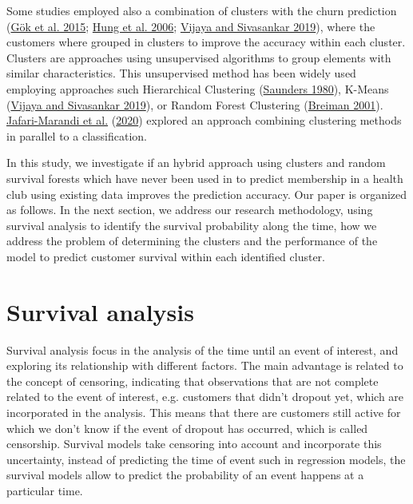 \documentclass[
  12pt,
]{article}
\begin{document}
Some studies employed also a combination of clusters with the churn prediction
(\protect\hyperlink{ref-gok_case_2015}{Gök et al. 2015}; \protect\hyperlink{ref-hung_applying_2006}{Hung et al. 2006}; \protect\hyperlink{ref-vijaya_sivasankar_2019}{Vijaya and Sivasankar 2019}), where the customers
where grouped in clusters to improve the accuracy within each cluster.
Clusters are approaches using unsupervised algorithms to group elements
with similar characteristics.
This unsupervised method has been widely used employing approaches
such Hierarchical Clustering (\protect\hyperlink{ref-Saunders_1980}{Saunders 1980}), K-Means (\protect\hyperlink{ref-vijaya_sivasankar_2019}{Vijaya and Sivasankar 2019}), or
Random Forest Clustering (\protect\hyperlink{ref-Breiman_2001}{Breiman 2001}).
\protect\hyperlink{ref-JafariMarandi_Denton_Idris_Smith_Keramati_2020}{Jafari-Marandi et al.} (\protect\hyperlink{ref-JafariMarandi_Denton_Idris_Smith_Keramati_2020}{2020}) explored an approach combining
clustering methods in parallel to a classification.

In this study, we investigate if an hybrid approach using clusters and random survival forests
which have never been used in to predict membership in a health club using existing data
improves the prediction accuracy.
Our paper is organized as follows. In the next section, we address our research methodology,
using survival analysis to identify the survival probability along the time, how
we address the problem of determining the clusters and the performance of the model
to predict customer survival within each identified cluster.

\hypertarget{survival-analysis}{%
\section{Survival analysis}\label{survival-analysis}}

Survival analysis focus in the analysis of the time until an event of interest,
and exploring its relationship with different factors.
The main advantage is related to the concept of censoring, indicating
that observations that are not complete related to the event of interest, e.g.
customers that didn't dropout yet, which are incorporated in the analysis.
This means that there are customers still active for which we don't know if
the event of dropout has occurred, which is called censorship.
Survival models take censoring into account and incorporate this uncertainty,
instead of predicting the time of event such in regression models, the survival models
allow to predict the probability of an event happens at a particular time.
\end{document}
